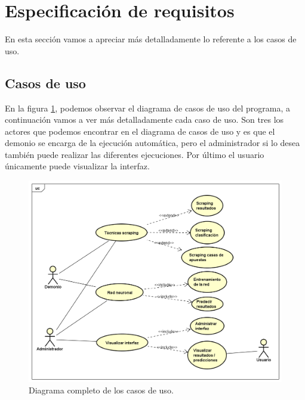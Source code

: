 \section{Especificación de requisitos}
En esta sección vamos a apreciar más detalladamente lo referente a los casos de uso.

\subsection{Casos de uso}

En la figura \ref{fig:DiagCasUso}, podemos observar el diagrama de casos de uso del programa, a continuación vamos a ver más detalladamente cada caso de uso. Son tres los actores que podemos encontrar en el diagrama de casos de uso y es que el demonio se encarga de la ejecución automática, pero el administrador si lo desea también puede realizar las diferentes ejecuciones. Por último el usuario únicamente puede visualizar la interfaz.

\begin{figure}
\centering
\includegraphics[width=.9\textwidth]{img/diagrama_casos_uso}
\caption{Diagrama completo de los casos de uso.}
\label{fig:DiagCasUso}
\end{figure}

